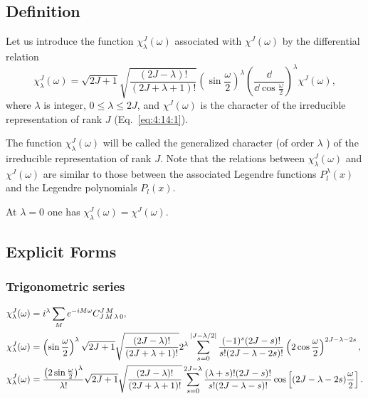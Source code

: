 \subsection{Definition}\label{sec:4.15.1}
Let us introduce the function $\chi_{\lambda}^{J}(\omega)$ associated with $\chi^{J}(\omega)$ by the differential relation
\begin{equation}
\chi_{\lambda}^{J}(\omega)=\sqrt{2 J+1} \sqrt{\frac{(2 J-\lambda)!}{(2 J+\lambda+1)!}}\left(\sin \frac{\omega}{2}\right)^{\lambda}\left(\frac{\dd}{\dd \cos \frac{\omega}{2}}\right)^{\lambda} \chi^{J}(\omega), \label{eq:4:15:1}
\end{equation}
where $\lambda$ is integer, $0 \leq \lambda \leq 2 J$, and $\chi^{J}(\omega)$ is the character of the irreducible representation of rank $J$ (Eq.~\eqref{eq:4:14:1}).

The function $\chi_{\lambda}^{J}(\omega)$ will be called the generalized character (of order $\lambda$ ) of the irreducible representation of rank $J$. Note that the relations between $\chi_{\lambda}^{J}(\omega)$ and $\chi^{J}(\omega)$ are similar to those between the associated Legendre functions $P_{l}^{\lambda}(x)$ and the Legendre polynomials $P_{l}(x)$.

At $\lambda=0$ one has $\chi_{\lambda}^{J}(\omega)=\chi^{J}(\omega)$.

\subsection{Explicit Forms}\label{sec:4.15.2}
\subsubsection{ Trigonometric series}
\begin{align}
& \chi_{\lambda}^{J}(\omega)=i^{\lambda} \sum_{M} e^{-i M \omega} C_{J\,M\,\lambda\,0}^{J\,M} , \label{eq:4:15:2}\\
& \chi_{\lambda}^{J}(\omega)=\left(\sin \frac{\omega}{2}\right)^{\lambda} \sqrt{2 J+1} \sqrt{\frac{(2 J-\lambda)!}{(2 J+\lambda+1)!}} 2^{\lambda} \sum_{s=0}^{|J-\lambda / 2|} \frac{(-1)^{s}(2 J-s)!}{s!(2 J-\lambda-2 s)!}\left(2 \cos \frac{\omega}{2}\right)^{2 J-\lambda-2 s}  ,\label{eq:4:15:3}\\
& \chi_{\lambda}^{J}(\omega)=\frac{\left(2 \sin \frac{\omega}{2}\right)^{\lambda}}{\lambda!} \sqrt{2 J+1} \sqrt{\frac{(2 J-\lambda)!}{(2 J+\lambda+1)!}} \sum_{s=0}^{2 J-\lambda} \frac{(\lambda+s)!(2 J-s)!}{s!(2 J-\lambda-s)!} \cos \left[(2 J-\lambda-2 s) \frac{\omega}{2}\right] .\label{eq:4:15:4}
\end{align}
